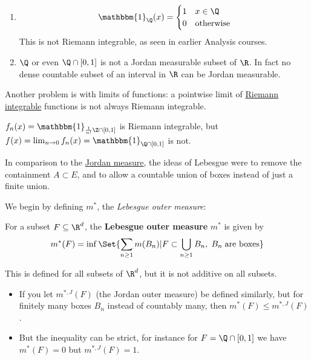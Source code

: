\documentclass{article}
\newcommand{\1}[1]{\mathbbm{1}_{#1}}
\begin{document}
\begin{eg}
    \leavevmode
    \begin{enumerate}[label=(\emph{\roman*})]
        \item
            \begin{equation*}
                \1{\Q}(x) = \begin{cases}
                    1 & x \in \Q \\
                    0 & \text{otherwise}
                \end{cases}
             \end{equation*}
            This is not Riemann integrable, as seen in earlier Analysis courses.
        \item $\Q$ or even $\Q \cap [0, 1]$ is not a Jordan measurable subset of $\R$.
            In fact no dense countable subset of an interval in $\R$ can be Jordan measurable.
    \end{enumerate}
\end{eg}

Another problem is with limits of functions: a pointwise limit of \hyperlink{def:riemannIntegrable}{Riemann integrable} functions is not always Riemann integrable.
\begin{eg}
    $f_n(x) = \1{\frac1{n!}\Z \cap [0, 1]}$ is Riemann integrable, but $f(x) = \lim_{n \to 0} f_n(x) = \1{\Q \cap [0, 1]}$ is not.
\end{eg}

In comparison to the \hyperlink{def:jMeasure}{Jordan measure}, the ideas of Lebesgue were to remove the containment $A \subset E$, and to allow a countable union of boxes instead of just a finite union.

We begin by defining $m^*$, the \emph{Lebesgue outer measure}:
\begin{defi}
    For a subset $F \subseteq \R^d$, the \textbf{Lebesgue outer measure} $m^*$ is given by
    \begin{equation*}
        m^*(F) = \inf\Set{\sum_{n \geq 1} m(B_n) | F \subset \bigcup_{n \geq 1} B_n, \; B_n \; \text{are boxes}}
    \end{equation*}
\end{defi}

This is defined for all subsets of $\R^d$, but it is not additive on all subsets.
\begin{remark}
    \leavevmode
    \begin{itemize}
        \item If you let $m^{*, J}(F)$ (the Jordan outer measure) be defined similarly, but for finitely many boxes $B_n$ instead of countably many, then $m^*(F) \leq m^{*, J}(F)$.
        \item But the inequality can be strict, for instance for $F = \Q \cap [0, 1]$ we have $m^*(F) = 0$ but $m^{*, J}(F) = 1$.
    \end{itemize}
\end{remark}
\end{document}
